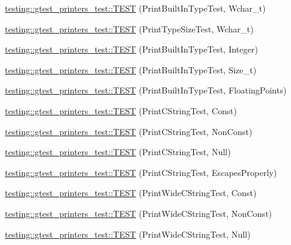 \begin{DoxyCompactItemize}
\item 
\hyperlink{namespacetesting_1_1gtest__printers__test_ab567ebd97eff0a4b9a20a5f5cb77d678}{testing\+::gtest\+\_\+printers\+\_\+test\+::\+T\+E\+ST} (Print\+Built\+In\+Type\+Test, Wchar\+\_\+t)
\item 
\hyperlink{namespacetesting_1_1gtest__printers__test_a705ec4c2886606a22194107397fceea6}{testing\+::gtest\+\_\+printers\+\_\+test\+::\+T\+E\+ST} (Print\+Type\+Size\+Test, Wchar\+\_\+t)
\item 
\hyperlink{namespacetesting_1_1gtest__printers__test_a278d53e99390c7b31ff531524fe5e86e}{testing\+::gtest\+\_\+printers\+\_\+test\+::\+T\+E\+ST} (Print\+Built\+In\+Type\+Test, Integer)
\item 
\hyperlink{namespacetesting_1_1gtest__printers__test_a991dc124d153742c3ca126b2fa9ccab5}{testing\+::gtest\+\_\+printers\+\_\+test\+::\+T\+E\+ST} (Print\+Built\+In\+Type\+Test, Size\+\_\+t)
\item 
\hyperlink{namespacetesting_1_1gtest__printers__test_acde0b28d177604ddb5e185d7b107f6f7}{testing\+::gtest\+\_\+printers\+\_\+test\+::\+T\+E\+ST} (Print\+Built\+In\+Type\+Test, Floating\+Points)
\item 
\hyperlink{namespacetesting_1_1gtest__printers__test_a6cd47b21ad8d9ac66ba57b5b6415a924}{testing\+::gtest\+\_\+printers\+\_\+test\+::\+T\+E\+ST} (Print\+C\+String\+Test, Const)
\item 
\hyperlink{namespacetesting_1_1gtest__printers__test_a89d9905fecee1b976c26d35498734dd4}{testing\+::gtest\+\_\+printers\+\_\+test\+::\+T\+E\+ST} (Print\+C\+String\+Test, Non\+Const)
\item 
\hyperlink{namespacetesting_1_1gtest__printers__test_ad29b97d58a4d1e5e8dd4d854f66b9e22}{testing\+::gtest\+\_\+printers\+\_\+test\+::\+T\+E\+ST} (Print\+C\+String\+Test, Null)
\item 
\hyperlink{namespacetesting_1_1gtest__printers__test_a140030b990011abab91d4c0b59f21edd}{testing\+::gtest\+\_\+printers\+\_\+test\+::\+T\+E\+ST} (Print\+C\+String\+Test, Escapes\+Properly)
\item 
\hyperlink{namespacetesting_1_1gtest__printers__test_a4caa1f81979cdc6f5ada95e01a4fae63}{testing\+::gtest\+\_\+printers\+\_\+test\+::\+T\+E\+ST} (Print\+Wide\+C\+String\+Test, Const)
\item 
\hyperlink{namespacetesting_1_1gtest__printers__test_a8812b5f088e13083ebb8a7e35fbcdae7}{testing\+::gtest\+\_\+printers\+\_\+test\+::\+T\+E\+ST} (Print\+Wide\+C\+String\+Test, Non\+Const)
\item 
\hyperlink{namespacetesting_1_1gtest__printers__test_acd1267d49d61ad53b2b8a88f68fca3a7}{testing\+::gtest\+\_\+printers\+\_\+test\+::\+T\+E\+ST} (Print\+Wide\+C\+String\+Test, Null)

\end{DoxyCompactItemize}
